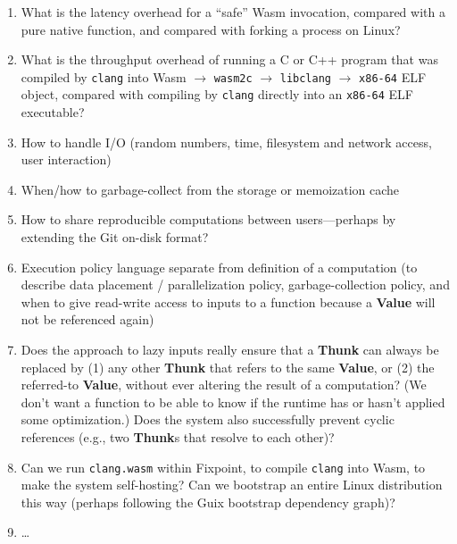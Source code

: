 \documentclass{article}
\newcommand{\valuex}{\textbf{Value}\xspace}
\newcommand{\thunk}{\textbf{Thunk}\xspace}
\newcommand{\thunks}{\textbf{Thunk}s\xspace}
\begin{document}
\begin{enumerate}[itemsep=0pt]
\item What is the latency overhead for a ``safe'' Wasm invocation, compared with a pure native function,
  and compared with forking a process on Linux?

\item What is the throughput overhead of running a C or C++ program
  that was compiled by \texttt{clang} into Wasm $\rightarrow$
  \texttt{wasm2c} $\rightarrow$ \texttt{libclang} $\rightarrow$
  \texttt{x86-64} ELF object, compared with compiling by \texttt{clang}
  directly into an \texttt{x86-64} ELF executable?

\item How to handle I/O (random numbers, time, filesystem and network access, user interaction)

\item When/how to garbage-collect from the storage or memoization cache

\item How to share reproducible computations between users---perhaps by extending the Git on-disk format?
  
\item Execution policy language separate from definition of a
  computation (to describe data placement / parallelization policy,
  garbage-collection policy, and when to give read-write access to
  inputs to a function because a \valuex will not be referenced again)

\item Does the approach to lazy inputs really ensure that a \thunk can
  always be replaced by (1) any other \thunk that refers to the same
  \valuex, or (2) the referred-to \valuex, without ever altering the
  result of a computation? (We don't want a function to be able to
  know if the runtime has or hasn't applied some optimization.) Does
  the system also successfully prevent cyclic references (e.g., two \thunks that resolve to
  each other)?

\item Can we run \texttt{clang.wasm} within Fixpoint, to compile
  \texttt{clang} into Wasm, to make the system self-hosting? Can we bootstrap an entire Linux distribution
  this way (perhaps following the Guix bootstrap dependency graph)?
 
\item \ldots
  
\end{enumerate}
\end{document}
